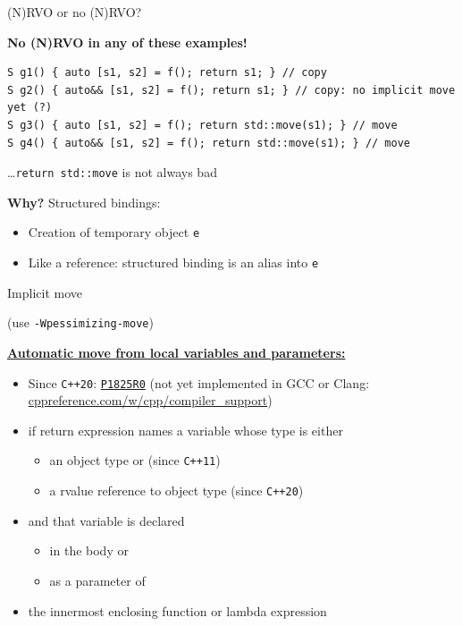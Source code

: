 \documentclass[compress,aspectratio=1610]{beamer}
\begin{document}
\begin{frame}[fragile]{(N)RVO or no (N)RVO?}
    \begin{center}
    \end{center}

    \textbf{No (N)RVO in any of these examples!}
    \begin{lstlisting}
S g1() { auto [s1, s2] = f(); return s1; } // copy
S g2() { auto&& [s1, s2] = f(); return s1; } // copy: no implicit move yet (?)
S g3() { auto [s1, s2] = f(); return std::move(s1); } // move
S g4() { auto&& [s1, s2] = f(); return std::move(s1); } // move
    \end{lstlisting}
    
    \hfill \ldots \texttt{return std::move} is not always bad

    \textbf{Why?} Structured bindings:
    \begin{itemize}
        \item Creation of temporary object \texttt{e}
        \item Like a reference: structured binding is an alias into \texttt{e}
    \end{itemize}
\end{frame}

\begin{frame}{Implicit move}
    \begin{center}

        (use \texttt{-Wpessimizing-move})
    \end{center}

    \href{https://en.cppreference.com/w/cpp/language/return}{\textbf{Automatic move from local variables and parameters:}}
    \begin{itemize}
        \item Since \texttt{C++20}: \href{http://www.open-std.org/jtc1/sc22/wg21/docs/papers/2019/p1825r0.html}{\texttt{P1825R0}} (not yet implemented in GCC or Clang: \href{https://en.cppreference.com/w/cpp/compiler_support}{cppreference.com/w/cpp/compiler\_support})
        \item if return expression names a variable whose type is either
        \begin{itemize}
            \item an object type or (since \texttt{C++11})
            \item a rvalue reference to object type (since \texttt{C++20})
        \end{itemize}
        \item and that variable is declared
        \begin{itemize}
            \item in the body or
            \item as a parameter of
        \end{itemize}
        \item the innermost enclosing function or lambda expression
    \end{itemize}
\end{frame}
\end{document}
